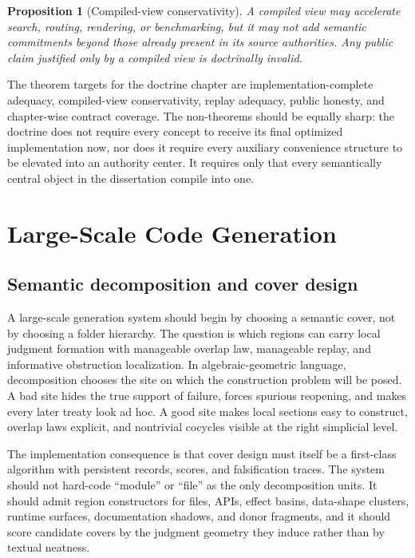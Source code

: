 \documentclass[11pt]{report}
\newtheorem{proposition}[definition]{Proposition}
\begin{document}
\begin{proposition}[Compiled-view conservativity]
A compiled view may accelerate search, routing, rendering, or benchmarking, but it may not add semantic commitments beyond those already present in its source authorities. Any public claim justified only by a compiled view is doctrinally invalid.
\end{proposition}

The theorem targets for the doctrine chapter are implementation-complete adequacy, compiled-view conservativity, replay adequacy, public honesty, and chapter-wise contract coverage. The non-theorems should be equally sharp: the doctrine does not require every concept to receive its final optimized implementation now, nor does it require every auxiliary convenience structure to be elevated into an authority center. It requires only that every semantically central object in the dissertation compile into one.

\part{Large-Scale Code Generation}
\chapter{Semantic decomposition and cover design}
A large-scale generation system should begin by choosing a semantic cover, not by choosing a folder hierarchy. The question is which regions can carry local judgment formation with manageable overlap law, manageable replay, and informative obstruction localization. In algebraic-geometric language, decomposition chooses the site on which the construction problem will be posed. A bad site hides the true support of failure, forces spurious reopening, and makes every later treaty look ad hoc. A good site makes local sections easy to construct, overlap laws explicit, and nontrivial cocycles visible at the right simplicial level.

The implementation consequence is that cover design must itself be a first-class algorithm with persistent records, scores, and falsification traces. The system should not hard-code ``module'' or ``file'' as the only decomposition units. It should admit region constructors for files, APIs, effect basins, data-shape clusters, runtime surfaces, documentation shadows, and donor fragments, and it should score candidate covers by the judgment geometry they induce rather than by textual neatness.
\end{document}
